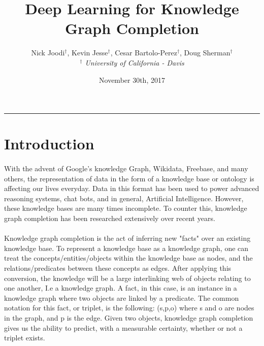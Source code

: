 \documentclass[11.5pt]{article}
\begin{document}
\title{Deep Learning for Knowledge Graph Completion}
\author{Nick Joodi$^\dagger$, Kevin Jesse$^\dagger$, Cesar Bartolo-Perez$^\dagger$, Doug Sherman$^\dagger$\\
	{\small\textit{$^\dagger$ University of California - Davis}}
} 
\date{November 30th, 2017}
\maketitle
\rule{\textwidth}{1pt}

\begin{abstract}

\end{abstract}

\tableofcontents

\section{Introduction}

\paragraph{} With the advent of Google's knowledge Graph, Wikidata, Freebase, and many others, the representation of data in the form of a knowledge base or ontology is affecting our lives everyday. Data in this format has been used to power advanced reasoning systems, chat bots, and in general, Artificial Intelligence. However, these knowledge bases are many times incomplete. To counter this, knowledge graph completion has been researched extensively over recent years. 

\paragraph{} Knowledge graph completion is the act of inferring new "facts" over an existing knowledge base. To represent a knowledge base as a knowledge graph, one can treat the concepts/entities/objects within the knowledge base as nodes, and the relations/predicates between these concepts as edges. After applying this conversion, the knowledge will be a large interlinking web of objects relating to one another, I.e a knowledge graph. A fact, in this case, is an instance in a knowledge graph where two objects are linked by a predicate. The common notation for this fact, or triplet, is the following:  (s,p,o) where s and o are nodes in the graph, and p is the edge. Given two objects, knowledge graph completion gives us the ability to predict, with a measurable certainty, whether or not a triplet exists.
\end{document}

